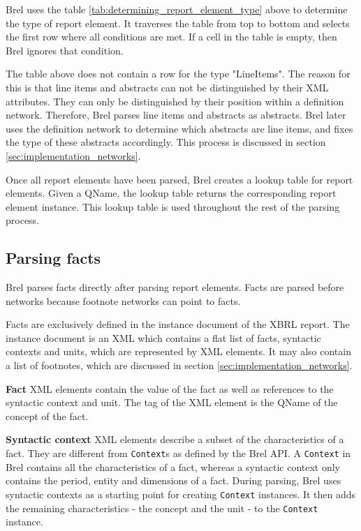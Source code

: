 Brel uses the table \ref{tab:determining_report_element_type} above to determine the type of report element.
It traverses the table from top to bottom and selects the first row where all conditions are met.
If a cell in the table is empty, then Brel ignores that condition. 

The table above does not contain a row for the type "LineItems".
The reason for this is that line items and abstracts can not be distinguished by their XML attributes.
They can only be distinguished by their position within a definition network.
Therefore, Brel parses line items and abstracts as abstracts.
Brel later uses the definition network to determine which abstracts are line items, and fixes the type of these abstracts accordingly.
This process is discussed in section \ref{sec:implementation_networks}.

Once all report elements have been parsed, Brel creates a lookup table for report elements.
Given a QName, the lookup table returns the corresponding report element instance.
This lookup table is used throughout the rest of the parsing process.

\subsection{Parsing facts}

Brel parses facts directly after parsing report elements.
Facts are parsed before networks because footnote networks can point to facts.

Facts are exclusively defined in the instance document of the XBRL report.
The instance document is an XML which contains a flat list of facts, syntactic contexts and units, which are represented by XML elements.
It may also contain a list of footnotes, which are discussed in section \ref{sec:implementation_networks}.

\textbf{Fact} XML elements contain the value of the fact as well as references to the syntactic context and unit.
The tag of the XML element is the QName of the concept of the fact. 

\textbf{Syntactic context} XML elements describe a subset of the characteristics of a fact.
They are different from \texttt{Context}s as defined by the Brel API.
A \texttt{Context} in Brel contains all the characteristics of a fact, whereas a syntactic context only contains the period, entity and dimensions of a fact.
During parsing, Brel uses syntactic contexts as a starting point for creating \texttt{Context} instances.
It then adds the remaining characteristics - the concept and the unit - to the \texttt{Context} instance.

